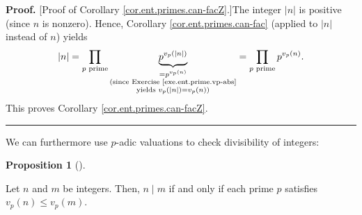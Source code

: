 \documentclass[numbers=enddot,12pt,final,onecolumn,notitlepage]{scrartcl}%
\numberwithin{exer}{subsection}
\theoremstyle{definition}
\newtheorem{prop}[theo]{Proposition}
\newenvironment{proposition}[1][]
{\begin{prop}[#1]\begin{leftbar}}
{\end{leftbar}\end{prop}}
\newenvironment{proof}[1][Proof]{\noindent\textbf{#1.} }{\ \rule{0.5em}{0.5em}}
\let\prodnonlimits\prod
\renewcommand{\prod}{\prodnonlimits\limits}
\begin{document}
\begin{proof}
[Proof of Corollary \ref{cor.ent.primes.can-facZ}.]The integer $\left\vert
n\right\vert $ is positive (since $n$ is nonzero). Hence, Corollary
\ref{cor.ent.primes.can-fac} (applied to $\left\vert n\right\vert $ instead of
$n$) yields%
\[
\left\vert n\right\vert =\prod_{p\text{ prime}}\underbrace{p^{v_{p}\left(
\left\vert n\right\vert \right)  }}_{\substack{=p^{v_{p}\left(  n\right)
}\\\text{(since Exercise \ref{exe.ent.prime.vp-abs}}\\\text{yields }%
v_{p}\left(  \left\vert n\right\vert \right)  =v_{p}\left(  n\right)
\text{)}}}=\prod_{p\text{ prime}}p^{v_{p}\left(  n\right)  }.
\]
This proves Corollary \ref{cor.ent.primes.can-facZ}.
\end{proof}

We can furthermore use $p$-adic valuations to check divisibility of integers:

\begin{proposition}
\label{prop.ent.primes.n|m}Let $n$ and $m$ be integers. Then, $n\mid m$ if and
only if each prime $p$ satisfies $v_{p}\left(  n\right)  \leq v_{p}\left(
m\right)  $.
\end{proposition}
\end{document}

